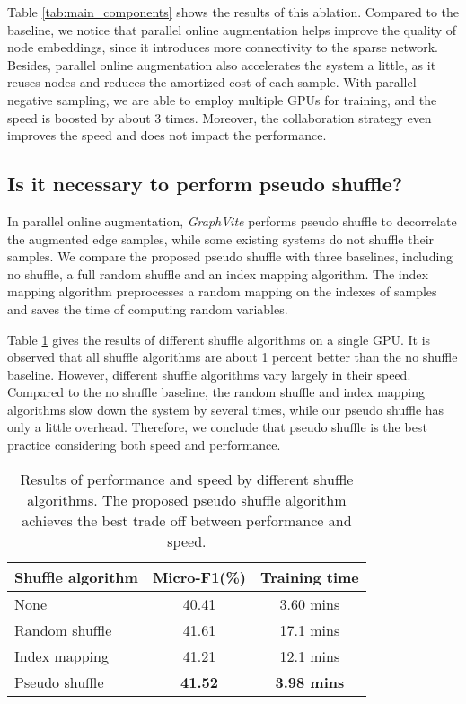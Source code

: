 \documentclass[sigconf]{acmart}
\newcommand{\best}[1]{\textbf{#1}}
\newcommand{\Graphy}{\textit{GraphVite}\xspace}
\begin{document}
Table \ref{tab:main_components} shows the results of this ablation. Compared to the baseline, we notice that parallel online augmentation helps improve the quality of node embeddings, since it introduces more connectivity to the sparse network. Besides, parallel online augmentation also accelerates the system a little, as it reuses nodes and reduces the amortized cost of each sample. With parallel negative sampling, we are able to employ multiple GPUs for training, and the speed is boosted by about 3 times. Moreover, the collaboration strategy even improves the speed and does not impact the performance.

\subsection{Is it necessary to perform pseudo shuffle?}

In parallel online augmentation, \Graphy performs pseudo shuffle to decorrelate the augmented edge samples, while some existing systems \cite{perozzi2014deepwalk, grover2016node2vec} do not shuffle their samples. We compare the proposed pseudo shuffle with three baselines, including no shuffle, a full random shuffle and an index mapping algorithm. The index mapping algorithm preprocesses a random mapping on the indexes of samples and saves the time of computing random variables.

Table \ref{tab:shuffle} gives the results of different shuffle algorithms on a single GPU. It is observed that all shuffle algorithms are about 1 percent better than the no shuffle baseline. However, different shuffle algorithms vary largely in their speed. Compared to the no shuffle baseline, the random shuffle and index mapping algorithms slow down the system by several times, while our pseudo shuffle has only a little overhead. Therefore, we conclude that pseudo shuffle is the best practice considering both speed and performance.

\begin{table}[!h]
    \centering
    \begin{tabular}{lcc}
        \toprule
        Shuffle algorithm   & Micro-F1(\%)  & Training time     \\
        \midrule
        None                & 40.41         & 3.60 mins         \\
        Random shuffle      & 41.61         & 17.1 mins         \\
        Index mapping       & 41.21         & 12.1 mins         \\
        \midrule
        Pseudo shuffle      & \best{41.52}  & \best{3.98 mins}  \\
        \bottomrule
    \end{tabular}
    \caption{Results of performance and speed by different shuffle algorithms. The proposed pseudo shuffle algorithm achieves the best trade off between performance and speed.}
    \label{tab:shuffle}
\end{table}
\end{document}
